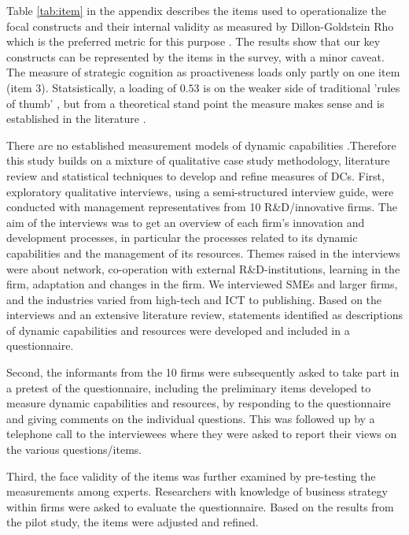 \documentclass[review,fleqn]{elsarticle}\usepackage[]{graphicx}\usepackage[]{color}
\begin{document}
Table \ref{tab:item} in the appendix describes the items used to operationalize the focal
constructs and their internal validity as measured by Dillon-Goldstein Rho which is the
preferred metric for this purpose \citep{Hair2019}. The results show that our key
constructs can be represented by the items in the survey, with a minor caveat. The measure
of strategic cognition as proactiveness loads only partly on one item (item
3). Statsistically, a loading of $0.53$ is on the weaker side of
traditional 'rules of thumb' \citep{Hair2010}, but from a theoretical stand point the
measure makes sense and is established in the literature \cite{covin2012}.


There are no established measurement models of dynamic capabilities
\citep{McKelvie2009,Schilke2018}.Therefore this study builds on a mixture of qualitative
case study methodology, literature review and statistical techniques to develop and refine
measures of DCs. First, exploratory qualitative interviews, using a semi-structured
interview guide, were conducted with management representatives from 10 R\&D/innovative
firms. The aim of the interviews was to get an overview of each firm's innovation and
development processes, in particular the processes related to its dynamic capabilities and
the management of its resources. Themes raised in the interviews were about network,
co-operation with external R\&D-institutions, learning in the firm, adaptation and changes
in the firm. We interviewed SMEs and larger firms, and the industries varied from
high-tech and ICT to publishing.  Based on the interviews and an extensive literature
review, statements identified as descriptions of dynamic capabilities and resources were
developed and included in a questionnaire.

Second, the informants from the 10 firms were subsequently asked to take part in a pretest
of the questionnaire, including the preliminary items developed to measure dynamic
capabilities and resources, by responding to the questionnaire and giving comments on the
individual questions. This was followed up by a telephone call to the interviewees where
they were asked to report their views on the various questions/items.

Third, the face validity of the items was further examined by pre-testing the measurements
among experts. Researchers with knowledge of business strategy within firms were asked to
evaluate the questionnaire. Based on the results from the pilot study, the items were
adjusted and refined.
\end{document}
